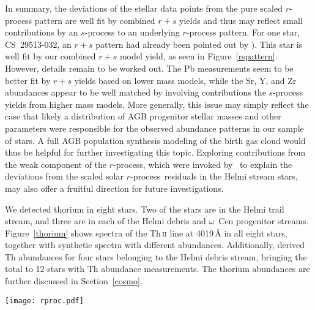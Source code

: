\documentclass[twocolumn]{aastex63}
\newcommand{\rproc}{$r$-process}
\begin{document}
In summary, the deviations of the stellar data points from the pure scaled $r$-process pattern are well fit by combined $r+s$ yields and thus may reflect small contributions by an $s$-process to an underlying $r$-process pattern. For one star, \mbox{CS~29513-032}, an $r+s$ pattern had already been pointed out by \citealt{Roederer10}). 
This star is well fit by our combined $r+s$ model yield, as seen in Figure~\ref{rspattern}. However, details remain to be worked out.  The Pb measurements seem to be better fit by $r+s$ yields based on lower mass models, while the Sr, Y, and Zr abundances appear to be well matched by involving contributions the $s$-process yields from higher mass models. More generally, this issue may simply reflect the case that likely a distribution of AGB progenitor stellar masses and other parameters were responsible for the observed abundance patterns in our sample of stars. A full AGB population synthesis modeling of the birth gas cloud would thus be helpful for further investigating this topic. Exploring contributions from the weak component of the \rproc, which were invoked by \citeauthor{Roederer10}\ to explain the deviations from the scaled solar \rproc\ residuals in the Helmi stream stars, may also offer a fruitful direction for future investigations.

We detected thorium in eight stars. Two of the stars are in the Helmi trail stream, and three are in each of the Helmi debris and $\omega$~Cen progenitor streams. Figure~\ref{thorium} shows spectra of the Th\,\textsc{ii} line at 4019\,{\AA} in all eight stars, together with synthetic spectra with different abundances. Additionally, \citet{Roederer10} derived Th abundances for four stars belonging to the Helmi debris stream, bringing the total to 12 stars with Th abundance measurements. 
The thorium abundances are further discussed in Section~\ref{cosmo}.


\begin{figure*}[!ht]
 \begin{center}
  \texttt{[image: rproc.pdf]} 
 \end{center}
\end{figure*}
\end{document}
